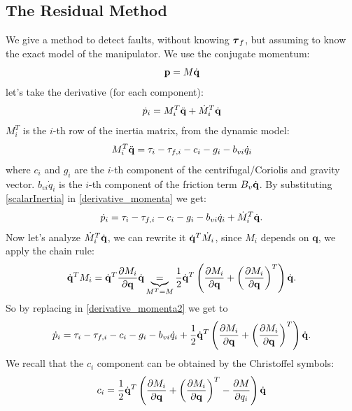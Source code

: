 \documentclass[10pt, a4paper]{report}
\newcommand{\q}{{\mathbf q}}
\begin{document}
\subsection{The Residual Method}
We give a method to detect faults, without knowing ${\boldsymbol{\tau}}_f$, but assuming to know the exact model of the manipulator. We use the conjugate momentum:\begin{equation}
    \mathbf p=M{\dot{\mathbf q}}  
\end{equation}
let's take the derivative (for each component):\begin{equation}\label{derivative_momenta}
    \dot p_i=M_i^T{\ddot{\mathbf q}}+\dot M_i^T{\dot{\mathbf q}} 
\end{equation}
$M_i^T$ is the $i$-th row of the inertia matrix, from the dynamic model:\begin{equation}\label{scalarInertia}
    M_i^T{\ddot{\mathbf q}}=\tau_i-\tau_{f,i}-c_i-g_i - b_{vi}\dot q_i
\end{equation}
where $c_i$ and $g_i$ are the $i$-th component of the centrifugal/Coriolis and gravity vector. $b_{vi}\dot q_i$ is the $i$-th component of the friction term $B_v{\dot{\mathbf q}}$. By substituting \eqref{scalarInertia} in \eqref{derivative_momenta} we get:\begin{equation}\label{derivative_momenta2}
     \dot p_i=\tau_i-\tau_{f,i}-c_i-g_i - b_{vi}\dot q_i+\dot M_i^T{\dot{\mathbf q}}.
\end{equation}
Now let's analyze $\dot M_i^T{\dot{\mathbf q}}$, we can rewrite it ${\dot{\mathbf q}}^T\dot M_i$, since $M_i$ depends on $\q$, we apply the chain rule:\begin{equation}
    \dq^T M_i=\dq^T\frac{\partial M_i}{\partial \q}\dq
    \underbrace{=}_{M^T=M}
    \frac{1}{2}\dq^T
    \left(\frac{\partial M_i}{\partial \q}+\left(\frac{\partial M_i}{\partial \q}\right)^T\right)\dq.
\end{equation}
So by replacing in \eqref{derivative_momenta2} we get to\begin{equation}
     \dot p_i=\tau_i-\tau_{f,i}-c_i-g_i - b_{vi}\dot q_i+
     \frac{1}{2}\dq^T
    \left(\frac{\partial M_i}{\partial \q}+\left(\frac{\partial M_i}{\partial \q}\right)^T\right)\dq.
\end{equation}
We recall that the $c_i$ component can be obtained by the Christoffel symbols:\begin{equation}
    c_i=\frac{1}{2}\dq^T
    \left(\frac{\partial M_i}{\partial \q}+\left(\frac{\partial M_i}{\partial \q}\right)^T-\frac{\partial M}{\partial q_i}\right)\dq
\end{equation}
\end{document}
